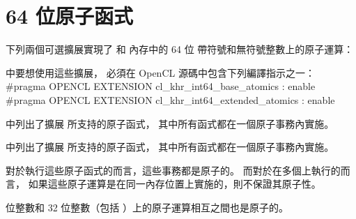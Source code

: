 \section{64 位原子函式}

下列兩個可選擴展實現了  和  內存中的 64 位
帶符號和無符號整數上的原子運算：
\startigBase
\item {}
\item {}
\stopigBase

中要想使用這些擴展，
必須在 OpenCL 源碼中包含下列編譯指示之一：
\startclc
#pragma OPENCL EXTENSION cl_khr_int64_base_atomics : enable
#pragma OPENCL EXTENSION cl_khr_int64_extended_atomics : enable
\stopclc

中列出了擴展  所支持的原子函式，
其中所有函式都在一個原子事務內實施。

{}

中列出了擴展  所支持的原子函式，
其中所有函式都在一個原子事務內實施。

{}

對於執行這些原子函式的而言，這些事務都是原子的。
而對於在多個上執行的而言，
如果這些原子運算是在同一內存位置上實施的，則不保證其原子性。

 位整數和 32 位整數（包括 ）上的原子運算相互之間也是原子的。
\stopnotepar
